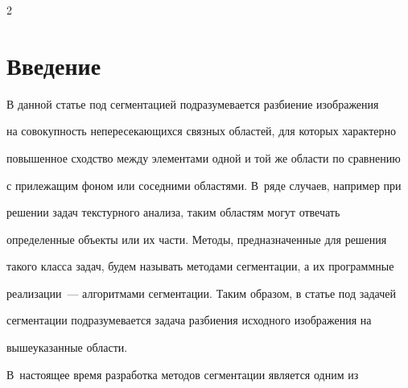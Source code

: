   












      \thispagestyle{headings}





      \begin{multicols}{2}


      


            \label{st\stat}





  


  \section{Введение}


  


  В данной статье под сегментацией подразумевается разбиение изображения 


на совокупность непересекающихся связных областей, для которых характерно 


повышенное сходство между элементами одной и той же области по сравнению 


с прилежащим фоном или соседними областями. В~ряде случаев, например при 


решении задач текстурного анализа, таким областям могут отвечать 


определенные объекты или их части. Методы, предназначенные для решения 


такого класса задач, будем называть методами сегментации, а их программные 


реализации~--- алгоритмами сегментации. Таким образом, в статье под задачей 


сегментации подразумевается задача разбиения исходного изображения на 


вышеуказанные области.


  


  В~настоящее время разработка методов сегментации является одним из 



\end{multicols}
